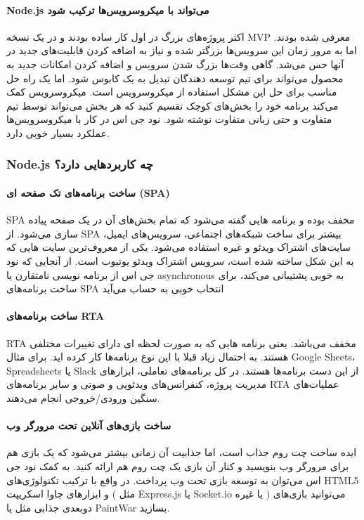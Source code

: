\paragraph{Node.js می‌تواند با میکروسرویس‌ها ترکیب شود}
اکثر پروژه‌های بزرگ در اول کار ساده بودند و در یک نسخه MVP معرفی شده بودند. اما به مرور زمان این سرویس‌ها بزرگتر شده و نیاز به اضافه کردن قابلیت‌های جدید در آنها حس می‌شد. گاهی وقت‌ها بزرگ شدن سرویس و اضافه کردن امکانات جدید به محصول می‌تواند برای تیم توسعه دهندگان تبدیل به یک کابوس شود. اما یک راه حل مناسب برای حل این مشکل استفاده از میکروسرویس است. میکروسرویس کمک می‌کند برنامه خود را بخش‌های کوچک تقسیم کنید که هر بخش می‌تواند توسط تیم متفاوت و حتی زبانی متفاوت نوشته شود. نود جی اس در کار با میکروسرویس‌ها عملکرد بسیار خوبی دارد.


\subsubsection{Node.js چه کاربردهایی دارد؟}
\paragraph{ساخت برنامه‌های تک صفحه ای (SPA)}
SPA مخفف
بوده و برنامه هایی گفته می‌شود که تمام بخش‌های آن در یک صفحه پیاده سازی می‌شود. از SPA بیشتر برای ساخت شبکه‌های اجتماعی، سرویس‌های ایمیل، سایت‌های اشتراک ویدئو و غیره استفاده می‌شود. یکی از معروف‌ترین سایت هایی که به این شکل ساخته شده است، سرویس اشتراک ویدئو یوتیوب است. از آنجایی که نود جی اس از برنامه نویسی نامتقارن یا asynchronous به خوبی پشتیبانی می‌کند، برای ساخت برنامه‌های SPA انتخاب خوبی به حساب می‌آید

\paragraph{ساخت برنامه‌های RTA}
RTA مخفف
 می‌باشد. یعنی برنامه هایی که به صورت لحظه ای دارای تغییرات مختلفی هستند. به احتمال زیاد قبلا با این نوع برنامه‌ها کار کرده اید. برای مثال Google Sheets، Spreadsheets یا Slack از این دست برنامه‌ها هستند. در کل برنامه‌های تعاملی، ابزارهای مدیریت پروژه، کنفرانس‌های ویدئویی و صوتی و سایر برنامه‌های RTA عملیات‌های سنگین ورودی/خروجی انجام می‌دهند.

\paragraph{ساخت بازی‌های آنلاین تحت مرورگر وب}
ایده ساخت چت روم جذاب است، اما جذابیت آن زمانی بیشتر می‌شود که یک بازی هم برای مرورگر وب بنویسید و کنار آن بازی یک چت روم هم ارائه کنید. به کمک نود جی اس می‌توان به توسعه بازی تحت وب پرداخت. در واقع با ترکیب تکنولوژی‌های HTML5 و ابزارهای جاوا اسکریپت ( مثل Express.js یا Socket.io یا غیره ) می‌توانید بازی‌های دوبعدی جذابی مثل
 یا PaintWar بسازید.

